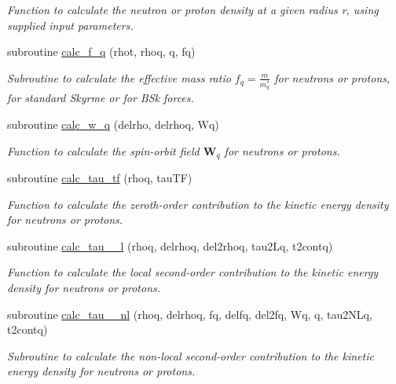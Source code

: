 \begin{DoxyCompactItemize}
\begin{DoxyCompactList}\small\item\em Function to calculate the neutron or proton density at a given radius r, using supplied input parameters. \end{DoxyCompactList}\item 
subroutine \mbox{\hyperlink{namespaceroutines_a701f911aa939448c5bee0589d57369ca}{calc\+\_\+f\+\_\+q}} (rhot, rhoq, q, fq)
\begin{DoxyCompactList}\small\item\em Subroutine to calculate the effective mass ratio $f_q=\frac{m}{m^*_q}$ for neutrons or protons, for standard Skyrme or for B\+Sk forces. \end{DoxyCompactList}\item 
subroutine \mbox{\hyperlink{namespaceroutines_a8c520afea1e9ca6698a0792fbac37e7a}{calc\+\_\+w\+\_\+q}} (delrho, delrhoq, Wq)
\begin{DoxyCompactList}\small\item\em Function to calculate the spin-\/orbit field $\textbf{W}_q$ for neutrons or protons. \end{DoxyCompactList}\item 
subroutine \mbox{\hyperlink{namespaceroutines_a421a5d2cca448f46b0dfb9bcdeec1111}{calc\+\_\+tau\+\_\+tf}} (rhoq, tau\+TF)
\begin{DoxyCompactList}\small\item\em Function to calculate the zeroth-\/order contribution to the kinetic energy density for neutrons or protons. \end{DoxyCompactList}\item 
subroutine \mbox{\hyperlink{namespaceroutines_aaa80f6938f2b9c661821fa8956f8deef}{calc\+\_\+tau\+\_\+\_\+l}} (rhoq, delrhoq, del2rhoq, tau2\+Lq, t2contq)
\begin{DoxyCompactList}\small\item\em Function to calculate the local second-\/order contribution to the kinetic energy density for neutrons or protons. \end{DoxyCompactList}\item 
subroutine \mbox{\hyperlink{namespaceroutines_a72bf2988651a9f3251dfb338ad1a7eca}{calc\+\_\+tau\+\_\+\_\+nl}} (rhoq, delrhoq, fq, delfq, del2fq, Wq, q, tau2\+N\+Lq, t2contq)
\begin{DoxyCompactList}\small\item\em Subroutine to calculate the non-\/local second-\/order contribution to the kinetic energy density for neutrons or protons. \end{DoxyCompactList}\item 

\end{DoxyCompactItemize}
